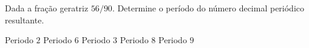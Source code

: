 Dada a fração geratriz $56/90$. Determine o período do número decimal periódico resultante.

Periodo $2$
Periodo $6$
Periodo $3$
Periodo $8$
Periodo $9$



